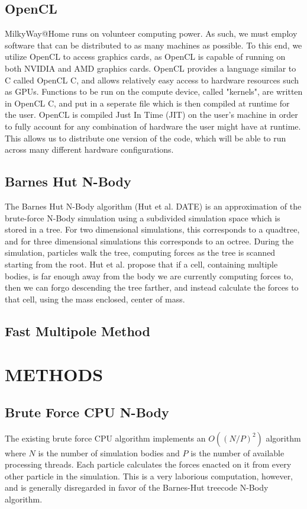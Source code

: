 \documentclass{thesis}
\begin{document}
\section{OpenCL}
MilkyWay@Home runs on volunteer computing power. As such, we must employ software that can be distributed to as many machines as possible. To this end, we utilize OpenCL to access graphics cards, as OpenCL is capable of running on both NVIDIA and AMD graphics cards. OpenCL provides a language similar to C called OpenCL C, and allows relatively easy access to hardware resources such as GPUs. Functions to be run on the compute device, called "kernels", are written in OpenCL C, and put in a seperate file which is then compiled at runtime for the user. OpenCL is compiled Just In Time (JIT) on the user's machine in order to fully account for any combination of hardware the user might have at runtime. This allows us to distribute one version of the code, which will be able to run across many different hardware configurations.
\section{Barnes Hut N-Body}
The Barnes Hut N-Body algorithm (Hut et al. DATE) is an approximation of the brute-force N-Body simulation using a subdivided simulation space which is stored in a tree. For two dimensional simulations, this corresponds to a quadtree, and for three dimensional simulations this corresponds to an octree. During the simulation, particles walk the tree, computing forces as the tree is scanned starting from the root. Hut et al. propose that if a cell, containing multiple bodies, is far enough away from the body we are currently computing forces to, then we can forgo descending the tree farther, and instead calculate the forces to that cell, using the mass enclosed, center of mass.
\section{Fast Multipole Method}
\chapter{METHODS}
\section{Brute Force CPU N-Body}
The existing brute force CPU algorithm implements an $O((N/P)^2)$ algorithm where $N$ is the number of simulation bodies and $P$ is the number of available processing threads. Each particle calculates the forces enacted on it from every other particle in the simulation. This is a very laborious computation, however, and is generally disregarded in favor of the Barnes-Hut treecode N-Body algorithm.
\end{document}
